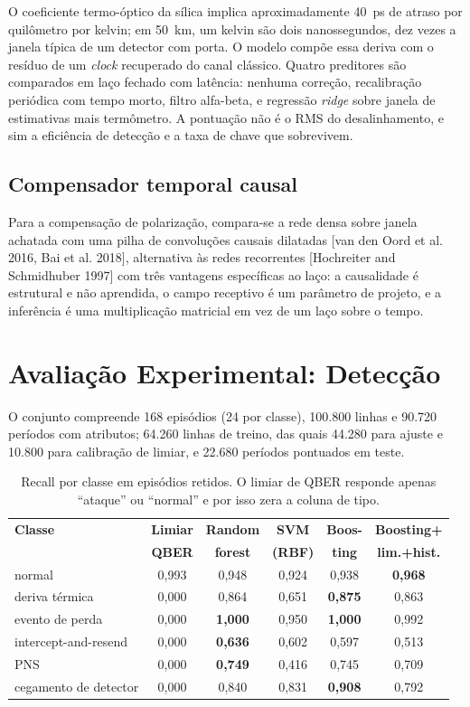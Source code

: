 \documentclass[12pt]{article}
\begin{document}
O coeficiente termo-óptico da sílica implica aproximadamente 40~ps de atraso por
quilômetro por kelvin; em 50~km, um kelvin são dois nanossegundos, dez vezes a
janela típica de um detector com porta. O modelo compõe essa deriva com o
resíduo de um \emph{clock} recuperado do canal clássico. Quatro preditores são
comparados em laço fechado com latência: nenhuma correção, recalibração periódica
com tempo morto, filtro alfa-beta, e regressão \emph{ridge} sobre janela de
estimativas mais termômetro. A pontuação não é o RMS do desalinhamento, e sim a
eficiência de detecção e a taxa de chave que sobrevivem.

\subsection{Compensador temporal causal}

Para a compensação de polarização, compara-se a rede densa sobre janela achatada
com uma pilha de convoluções causais dilatadas [van den Oord et al. 2016,
Bai et al. 2018], alternativa às redes recorrentes [Hochreiter and Schmidhuber 1997]
com três vantagens específicas ao laço: a causalidade é estrutural e não
aprendida, o campo receptivo é um parâmetro de projeto, e a inferência é uma
multiplicação matricial em vez de um laço sobre o tempo.

\section{Avaliação Experimental: Detecção}

O conjunto compreende 168 episódios (24 por classe), 100.800 linhas e 90.720
períodos com atributos; 64.260 linhas de treino, das quais 44.280 para ajuste e
10.800 para calibração de limiar, e 22.680 períodos pontuados em teste.

\begin{table}[htbp]
\centering
\caption{Recall por classe em episódios retidos. O limiar de QBER responde apenas
``ataque'' ou ``normal'' e por isso zera a coluna de tipo.}
\label{tab:recall}
\footnotesize
\setlength{\tabcolsep}{4.5pt}
\begin{tabular}{@{}lccccc@{}}
\toprule
\textbf{Classe} & \textbf{Limiar} & \textbf{Random} & \textbf{SVM} & \textbf{Boos-} & \textbf{Boosting+} \\
 & \textbf{QBER} & \textbf{forest} & \textbf{(RBF)} & \textbf{ting} & \textbf{lim.+hist.} \\
\midrule
normal                & 0,993 & 0,948 & 0,924 & 0,938 & \textbf{0,968} \\
deriva térmica        & 0,000 & 0,864 & 0,651 & \textbf{0,875} & 0,863 \\
evento de perda       & 0,000 & \textbf{1,000} & 0,950 & \textbf{1,000} & 0,992 \\
intercept-and-resend  & 0,000 & \textbf{0,636} & 0,602 & 0,597 & 0,513 \\
PNS                   & 0,000 & \textbf{0,749} & 0,416 & 0,745 & 0,709 \\
cegamento de detector & 0,000 & 0,840 & 0,831 & \textbf{0,908} & 0,792 \\
\bottomrule
\end{tabular}
\end{table}
\end{document}
